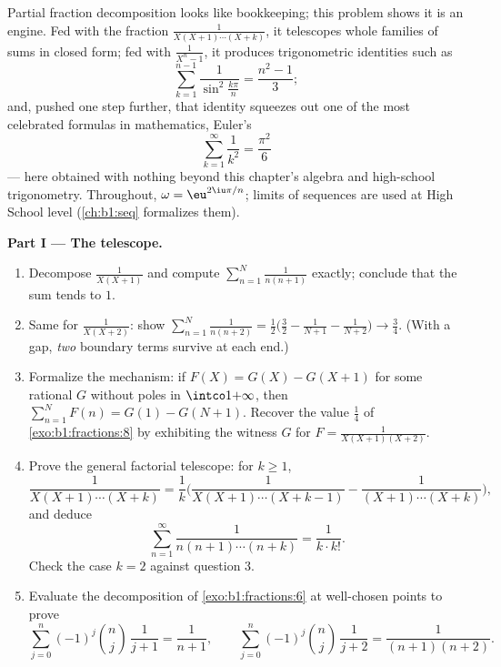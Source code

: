 \begin{problem}\label{pb:b1:fractions:1}
Partial fraction decomposition looks like bookkeeping; this problem
shows it is an engine. Fed with the fraction
$\frac1{X(X+1)\cdots(X+k)}$, it telescopes whole families of sums
in closed form; fed with $\frac1{X^n - 1}$, it produces
trigonometric identities such as
\[
\sum_{k=1}^{n-1}\frac{1}{\sin^2\frac{k\pi}{n}} = \frac{n^2-1}{3} ;
\]
and, pushed one step further, that identity squeezes out one of the
most celebrated formulas in mathematics, Euler's
\[
\sum_{k=1}^{\infty}\frac1{k^2} = \frac{\pi^2}{6}
\]
--- here obtained with nothing beyond this chapter's algebra and
high-school trigonometry.
Throughout, $\omega = \eu^{2\iu\pi/n}$; limits of sequences are
used at High School level (\cref{ch:b1:seq} formalizes them).

\medskip
\noindent\textbf{Part I --- The telescope.}
\begin{enumerate}
  \item Decompose $\frac1{X(X+1)}$ and compute $\sum_{n=1}^{N}
        \frac1{n(n+1)}$ exactly; conclude that the sum tends to
        $1$.
  \item Same for $\frac1{X(X+2)}$: show $\sum_{n=1}^{N}
        \frac1{n(n+2)} = \frac12\bigl(\frac32 - \frac1{N+1} -
        \frac1{N+2}\bigr) \to \frac34$. (With a gap, \emph{two}
        boundary terms survive at each end.)
  \item Formalize the mechanism: if $F(X) = G(X) - G(X+1)$ for
        some rational $G$ without poles in $\intco1{+\infty}$,
        then $\sum_{n=1}^N F(n) = G(1) - G(N+1)$. Recover the
        value $\frac14$ of \cref{exo:b1:fractions:8} by exhibiting
        the witness $G$ for $F = \frac1{X(X+1)(X+2)}$.
  \item Prove the general factorial telescope: for $k \geq 1$,
        \[
        \frac{1}{X(X+1)\cdots(X+k)}
        = \frac1k\biggl(\frac{1}{X(X+1)\cdots(X+k-1)}
        - \frac{1}{(X+1)\cdots(X+k)}\biggr),
        \]
        and deduce
        \[
        \sum_{n=1}^{\infty}\frac{1}{n(n+1)\cdots(n+k)}
        = \frac{1}{k \cdot k!} .
        \]
        Check the case $k = 2$ against question 3.
  \item Evaluate the decomposition of \cref{exo:b1:fractions:6}
        at well-chosen points to prove
        \[
        \sum_{j=0}^{n}(-1)^j\binom nj\,\frac1{j+1}
        = \frac1{n+1},
        \qquad
        \sum_{j=0}^{n}(-1)^j\binom nj\,\frac1{j+2}
        = \frac1{(n+1)(n+2)} .
        \]
\end{enumerate}


\end{problem}
